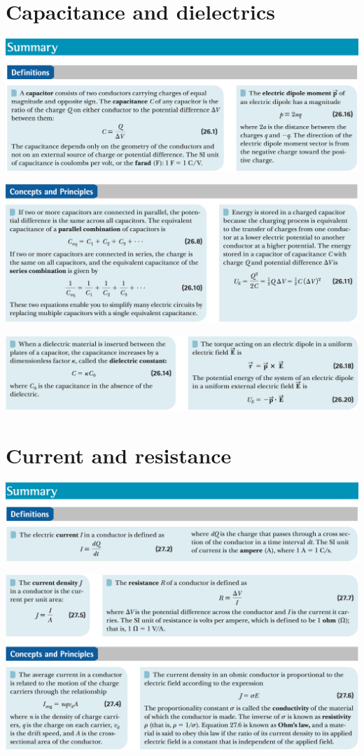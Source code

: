 \documentclass[12pt,a4paper]{article}
\newcommand{\N}{\noindent}
\begin{document}
	\section{Capacitance and dielectrics}
		\N \includegraphics[scale=.42]{4_a.png}
		
		\vspace{2mm}
		\N \includegraphics[scale=.42]{4_b.png}
		
		\vspace{2mm}
		\N \includegraphics[scale=.42]{4_c.png}
		
	\section{Current and resistance}
		\N \includegraphics[scale=.42]{5_a.png}
		
		\vspace{2mm}
		\N \includegraphics[scale=.42]{5_b.png}
		
\end{document}
